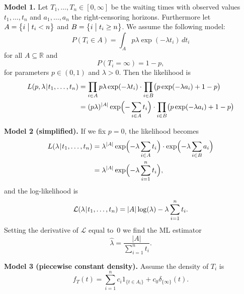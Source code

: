 \documentclass[a4paper]{article}
\def\cond#1#2{(#1\mskip1mu|\mskip1mu #2)}
\def\L{\mathcal{L}}
\def\R{\mathbb{R}}
\begin{document}
\textbf{Model 1.}
Let $T_1, \ldots, T_n \in [0, \infty]$ be the waiting times with observed
values $t_1, \ldots, t_n$ and $a_1,
\ldots, a_n$ the right-censoring horizons.  Furthermore let $A = \bigl\{ i \bigm|
t_i < n \bigr\}$ and $B = \bigl\{ i \bigm| t_i \geq n \bigr\}$.  We assume
the following model:
\begin{equation*}
  P(T_i \in A)
  = \int_A p \lambda \exp(-\lambda t_i) \,dt_i
\end{equation*}
for all $A\subseteq\R$ and
\begin{equation*}
  P(T_i = \infty)
  = 1-p,
\end{equation*}
for parameters $p\in(0,1)$ and $\lambda>0$.
Then the likelihood is
\begin{align*}
  L\cond{p, \lambda}{t_1, \ldots, t_n}
  &= \prod_{i\in A} p \lambda \exp(-\lambda t_i)
     \cdot \prod_{i\in B} \bigl(p \exp(-\lambda a_i) + 1-p \bigr) \\
   &= (p\lambda)^{|A|} \exp\Bigl( -\sum_{i\in A}t_i \Bigr)
     \cdot \prod_{i\in B} \bigl(p \exp(-\lambda a_i) + 1-p \bigr)
\end{align*}

\textbf{Model 2 (simplified).}
If we fix $p=0$, the likelihood becomes
\begin{align*}
  L\cond{\lambda}{t_1, \ldots, t_n}
   &= \lambda^{|A|} \exp\Bigl( - \lambda \sum_{i\in A}t_i \Bigr)
     \cdot \exp\Bigl( - \lambda \sum_{i\in B}a_i \Bigr) \\
   &= \lambda^{|A|} \exp\Bigl( - \lambda \sum_{i=1}^n t_i \Bigr),
\end{align*}
and the log-likelihood is
\begin{equation*}
  \L\cond{\lambda}{t_1, \ldots, t_n}
    = |A| \log(\lambda) - \lambda \sum_{i=1}^n t_i.
\end{equation*}
Setting the derivative of $\L$ equal to~$0$ we find
the ML estimator
\begin{equation*}
  \hat\lambda = \frac{|A|}{\sum_{i=1}^n t_i}.
\end{equation*}

\textbf{Model 3 (piecewise constant density).}
Assume the density of $T_i$ is
\begin{equation*}
  f_T(t) = \sum_{i=1}^n c_i 1_{\{t\in A_i\}} + c_0 \delta_{\{\infty\}}(t).
\end{equation*}
\end{document}
